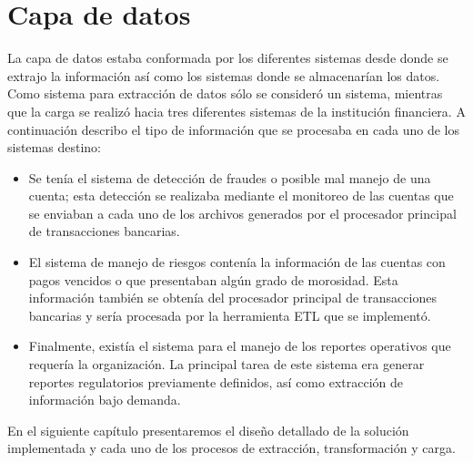 \section{Capa de datos}

La capa de datos estaba conformada por los diferentes sistemas desde donde se
extrajo la información así como los sistemas donde se almacenarían los
datos. Como sistema para extracción de datos sólo se consideró un sistema,
mientras que la carga se realizó hacia tres diferentes sistemas de la
institución financiera. A continuación describo el tipo de información que se
procesaba en cada uno de los sistemas destino:

\begin{itemize}

\item Se tenía el sistema de detección de fraudes o posible mal manejo de una
  cuenta; esta detección se realizaba mediante el monitoreo de las cuentas que
  se enviaban a cada uno de los archivos generados por el procesador principal
  de transacciones bancarias.

\item El sistema de manejo de riesgos contenía la información de las cuentas
  con pagos vencidos o que presentaban algún grado de morosidad. Esta
  información también se obtenía del procesador principal de transacciones
  bancarias y sería procesada por la herramienta ETL que se implementó.

\item Finalmente, existía el sistema para el manejo de los reportes operativos
  que requería la organización. La principal tarea de este sistema era generar
  reportes regulatorios previamente definidos, así como extracción de
  información bajo demanda.
\end{itemize}

En el siguiente capítulo presentaremos el diseño detallado de la solución implementada y cada uno de los procesos de extracción, transformación y carga.

\cleardoublepage

